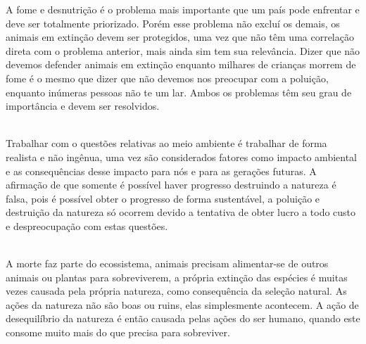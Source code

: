 \documentclass[a4paper, 12pt]{article}
\begin{document}
    \par A fome e desnutrição é o problema mais importante que um país pode enfrentar e deve ser totalmente priorizado. Porém esse problema não excluí os demais, os animais em extinção devem ser protegidos, uma vez que não têm uma correlação direta com o problema anterior, mais ainda sim tem sua relevância. Dizer que não devemos defender animais em extinção enquanto milhares de crianças morrem de fome é o mesmo que dizer que não devemos nos preocupar com a poluição, enquanto inúmeras pessoas não te um lar. Ambos os problemas têm seu grau de importância e devem ser resolvidos. \\

    \noindent{} \\
    
    \par Trabalhar com o questões relativas ao meio ambiente é trabalhar de forma realista e não ingênua, uma vez são considerados fatores como impacto ambiental e as consequências desse impacto para nós e para as gerações futuras. A afirmação de que somente é possível haver  progresso destruindo a natureza é falsa, pois é possível obter o progresso de forma sustentável, a poluição e destruição da natureza só ocorrem devido a tentativa de obter lucro a todo custo e despreocupação com estas questões. \\

    \noindent{} \\

    \par A morte faz parte do ecossistema, animais precisam alimentar-se de outros animais ou plantas para sobreviverem, a própria extinção das espécies é muitas vezes causada pela própria natureza, como consequência da seleção natural. As ações da natureza não são boas ou ruins, elas simplesmente acontecem. A ação de desequilíbrio da natureza é então causada pelas ações do ser humano, quando este consome muito mais do que precisa para sobreviver.
\end{document}
